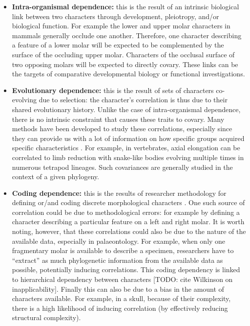\documentclass[12pt,letterpaper]{article}
\begin{document}
\begin{itemize}
    \item \textbf{Intra-organismal dependence:} this is the result of an intrinsic biological link between two characters through development, pleiotropy, and/or biological function.
    For example the lower and upper molar characters in mammals generally occlude one another. 
    Therefore, one character describing a feature of a lower molar will be expected to be complemented by the surface of the occluding upper molar.
	Characters of the occlusal surface of two opposing molars will be expected to directly covary.
    These links can be the targets of comparative developmental biology \citep{goswami2006morphological,goswami2010,goswami2014macroevolutionary} or functional investigations. 


    \item \textbf{Evolutionary dependence:} this is the result of sets of characters co-evolving due to selection: the character's correlation is thus due to their shared evolutionary history.
	Unlike the case of intra-organismal dependence, there is no intrinsic constraint that causes these traits to covary.
    Many methods have been developed to study these correlations, especially since they can provide us with a lot of information on how specific groups acquired specific characteristics \citep{Lande1983,Maddison1990,Pagel1994,Pagel2006,Grabowski2016}.
    For example, in vertebrates, axial elongation can be correlated to limb reduction with snake-like bodies evolving multiple times in numerous tetrapod lineages.
	Such covariances are generally studied in the context of a given phylogeny.

    \item \textbf{Coding dependence:} this is the results of researcher methodology for defining or/and coding discrete morphological characters \citep{Brazeau2011,simoes2017giant}.
    One such source of correlation could be due to methodological errors: for example by defining a character describing a particular feature on a left and right molar.
    It is worth noting, however, that these correlations could also be due to the nature of the available data, especially in palaeontology.
    For example, when only one fragmentary molar is available to describe a specimen, researchers have to ``extract'' as much phylogenetic information from the available data as possible, potentially inducing correlations.
    This coding dependency is linked to hierarchical dependency between characters [TODO: cite Wilkinson on inapplicability].
    Finally this can also be due to a bias in the amount of characters available.
    For example, in a skull, because of their complexity, there is a high likelihood of inducing correlation (by effectively reducing structural complexity).
\end{itemize}
\end{document}
